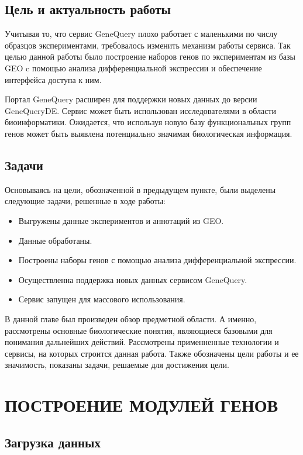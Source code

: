 \documentclass[times,specification,annotation]{itmo-student-thesis}
\begin{document}
\section{Цель и актуальность работы}

Учитывая то, что сервис GeneQuery плохо работает с маленькими по числу образцов экспериментами, требовалось изменить механизм работы сервиса. Так целью данной работы было построение наборов генов по экспериментам из базы GEO c помощью анализа дифференциальной экспрессии и обеспечение интерфейса доступа к ним. 

Портал GeneQuery расширен для поддержки новых данных до версии GeneQueryDE. Сервис может быть использован исследователями в области биоинформатики. Ожидается, что используя новую базу функциональных групп генов может быть выявлена потенциально значимая биологическая информация. 

\section{Задачи}

Основываясь на цели, обозначенной в предыдущем пункте, были выделены следующие задачи, решенные в ходе работы:
\begin{itemize}
    \item Выгружены данные экспериментов и аннотаций из GEO.
    \item Данные обработаны.
    \item Построены наборы генов с помощью анализа дифференциальной экспрессии.
    \item Осуществленна поддержка новых данных сервисом GeneQuery.
    \item Сервис запущен для массового использования.
\end{itemize}

\chapterconclusion

В данной главе был произведен обзор предметной области. А именно, рассмотрены основные биологические понятия, являющиеся базовыми для понимания дальнейших действий. Рассмотрены применненные технологии и сервисы, на которых строится данная работа. Также обозначены цели работы и ее значимость, показаны задачи, решаемые для достижения цели. 
\finishrelatedwork

\chapter{ПОСТРОЕНИЕ МОДУЛЕЙ ГЕНОВ}

\section{Загрузка данных}
\end{document}
